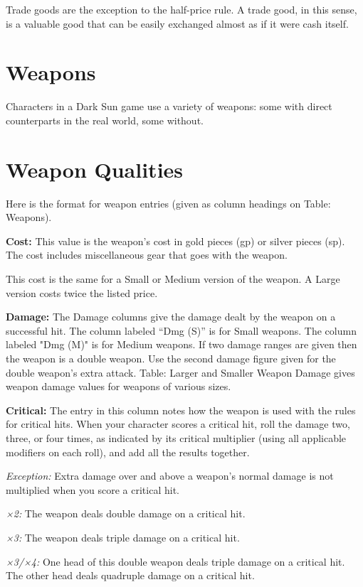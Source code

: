 Trade goods are the exception to the half-price rule. A trade good, in this sense, is a valuable good that can be easily exchanged almost as if it were cash itself.

\section{Weapons}
Characters in a Dark Sun game use a variety of weapons: some with direct counterparts in the real world, some without.




\section{Weapon Qualities}
Here is the format for weapon entries (given as column headings on Table: Weapons).

\textbf{Cost:} This value is the weapon’s cost in gold pieces (gp) or silver pieces (sp). The cost includes miscellaneous gear that goes with the weapon.

This cost is the same for a Small or Medium version of the weapon. A Large version costs twice the listed price.

\textbf{Damage:} The Damage columns give the damage dealt by the weapon on a successful hit. The column labeled ``Dmg (S)'' is for Small weapons. The column labeled "Dmg (M)" is for Medium weapons. If two damage ranges are given then the weapon is a double weapon. Use the second damage figure given for the double weapon’s extra attack. Table: Larger and Smaller Weapon Damage gives weapon damage values for weapons of various sizes.

\textbf{Critical:} The entry in this column notes how the weapon is used with the rules for critical hits. When your character scores a critical hit, roll the damage two, three, or four times, as indicated by its critical multiplier (using all applicable modifiers on each roll), and add all the results together.

\textit{Exception:} Extra damage over and above a weapon’s normal damage is not multiplied when you score a critical hit.

\textit{×2:} The weapon deals double damage on a critical hit.

\textit{×3:} The weapon deals triple damage on a critical hit.

\textit{×3/×4:} One head of this double weapon deals triple damage on a critical hit. The other head deals quadruple damage on a critical hit.

